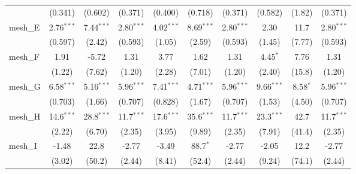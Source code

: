 \begin{tabular}{lccccccccc}
                                                               & (0.341)       & (0.602)       & (0.371)       & (0.400)       & (0.718)       & (0.371)       & (0.582)       & (1.82)        & (0.371)\\   
   mesh\_E                                                     & 2.76$^{***}$  & 7.44$^{***}$  & 2.80$^{***}$  & 4.02$^{***}$  & 8.69$^{***}$  & 2.80$^{***}$  & 2.30          & 11.7          & 2.80$^{***}$\\   
                                                               & (0.597)       & (2.42)        & (0.593)       & (1.05)        & (2.59)        & (0.593)       & (1.45)        & (7.77)        & (0.593)\\   
   mesh\_F                                                     & 1.91          & -5.72         & 1.31          & 3.77          & 1.62          & 1.31          & 4.45$^{*}$    & 7.76          & 1.31\\   
                                                               & (1.22)        & (7.62)        & (1.20)        & (2.28)        & (7.01)        & (1.20)        & (2.40)        & (15.8)        & (1.20)\\   
   mesh\_G                                                     & 6.58$^{***}$  & 5.16$^{***}$  & 5.96$^{***}$  & 7.41$^{***}$  & 4.71$^{***}$  & 5.96$^{***}$  & 9.66$^{***}$  & 8.58$^{*}$    & 5.96$^{***}$\\   
                                                               & (0.703)       & (1.66)        & (0.707)       & (0.828)       & (1.67)        & (0.707)       & (1.53)        & (4.50)        & (0.707)\\   
   mesh\_H                                                     & 14.6$^{***}$  & 28.8$^{***}$  & 11.7$^{***}$  & 17.6$^{***}$  & 35.6$^{***}$  & 11.7$^{***}$  & 23.3$^{***}$  & 42.7          & 11.7$^{***}$\\   
                                                               & (2.22)        & (6.70)        & (2.35)        & (3.95)        & (9.89)        & (2.35)        & (7.91)        & (41.4)        & (2.35)\\   
   mesh\_I                                                     & -1.48         & 22.8          & -2.77         & -3.49         & 88.7$^{*}$    & -2.77         & -2.05         & 12.2          & -2.77\\   
                                                               & (3.02)        & (50.2)        & (2.44)        & (8.41)        & (52.4)        & (2.44)        & (9.24)        & (74.1)        & (2.44)\\   

\end{tabular}
